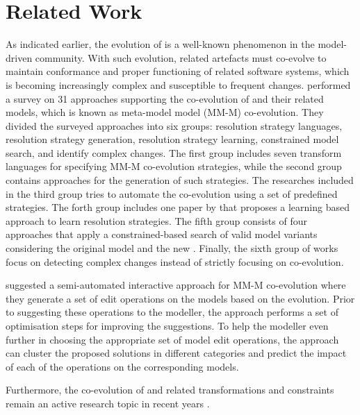 \section{Related Work} \label{sec:RW}

As indicated earlier, the evolution of \metamodels is a well-known phenomenon in the model-driven community. With such evolution, related artefacts must co-evolve to maintain conformance and proper functioning of related software systems, which is becoming increasingly complex and susceptible to frequent changes. \Textcite{Hebig2017} performed a survey on 31 approaches supporting the co-evolution of \metamodels and their related models, which is known as meta-model model (MM-M) co-evolution. They divided the surveyed approaches into six groups: resolution strategy languages, resolution strategy generation, resolution strategy learning, constrained model search, and identify complex changes. The first group includes seven transform languages for specifying MM-M co-evolution strategies, while the second group contains approaches for the generation of such strategies. The researches included in the third group tries to automate the co-evolution using a set of predefined strategies. The forth group includes one paper by \textcite{Anguel2013} that proposes a learning based approach to learn resolution strategies. The fifth group consists of four approaches that apply a constrained-based search of valid model variants considering the original model and the new \metamodel. Finally, the sixth group of works focus on detecting complex \metamodel changes instead of strictly focusing on co-evolution.

\Textcite{Kessentini2022} suggested a semi-automated interactive approach for MM-M co-evolution where they generate a set of edit operations on the models based on the \metamodel evolution. Prior to suggesting these operations to the modeller, the approach performs a set of optimisation steps for improving the suggestions. To help the modeller even further in choosing the appropriate set of model edit operations, the approach can cluster the proposed solutions in different categories and predict the impact of each of the operations on the corresponding models.

Furthermore, the co-evolution of \metamodel and related transformations and constraints remain an active research topic in recent years \cite{Kusel2015, Khelladi2017, garcia2013}.

